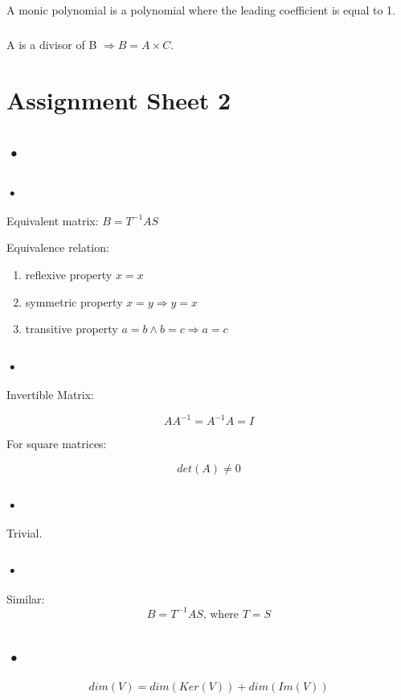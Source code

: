 \documentclass{report}
\begin{document}
\section{}

\subsection{}
A monic polynomial is a polynomial where the leading coefficient is equal to 1.
\subsection{}
A is a divisor of B $\Rightarrow B=A\times C$.

\chapter{Assignment Sheet 2}
\section{•}
\subsection{•}
Equivalent matrix:
$B=T^{-1}AS$

Equivalence relation:
\begin{enumerate}
\item reflexive property $x=x$
\item symmetric property $x=y \Rightarrow y=x$
\item transitive property $a=b \land b=c \Rightarrow a=c$
\end{enumerate}
\subsection{•}
Invertible Matrix:

$$AA^{-1}=A^{-1}A=I$$

For square matrices:

$$det(A) \neq 0$$
\subsection{•}
Trivial.
\subsection{•}
Similar:
$$B=T^{-1}AS\textrm{, where }T=S$$

\section{•}
$$dim(V)=dim(Ker(V))+dim(Im(V))$$
\end{document}
